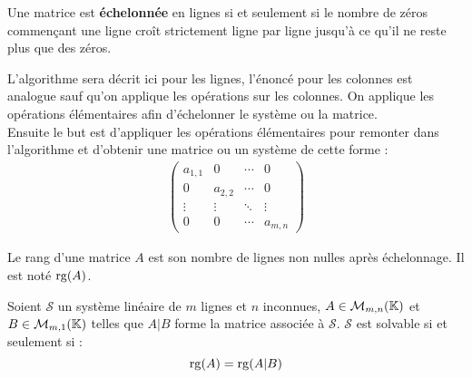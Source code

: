 \begin{definition}
	Une matrice est \textbf{échelonnée} en lignes si et seulement si le nombre de zéros commençant une ligne croît strictement ligne par ligne jusqu'à ce qu'il ne reste plus que des zéros.
\end{definition}

L'algorithme sera décrit ici pour les lignes, l'énoncé pour les colonnes est analogue sauf qu'on applique les opérations sur les colonnes.
   	On applique les opérations élémentaires afin d'échelonner le système ou la matrice.
    \\
    Ensuite le but est d'appliquer les opérations élémentaires pour \og remonter \fg dans l'algorithme et d'obtenir une matrice ou un système de cette forme :
    \begin{align*}
        \begin{pmatrix}
            a_{1,1} & 0 & \cdots & 0 \\
            0 & a_{2,2} & \cdots & 0 \\ 
            \vdots & \vdots & \ddots & \vdots \\ 
            0 & 0 & \cdots & a_{m,n}
        \end{pmatrix}
    \end{align*}

\begin{definition}
	Le rang d'une matrice $A$ est son nombre de lignes non nulles après échelonnage. Il est noté $\operatorname{rg}(A)$.
\end{definition}

\begin{theorem}
    Soient $\mathcal{S}$ un système linéaire de $m$ lignes et $n$ inconnues, $A \in \mathcal{M}_{m,n}(\mathbb{K})$ et $B \in \mathcal{M}_{m,1}(\mathbb{K})$ telles que $A|B$ forme la matrice associée à $\mathcal{S}$. $\mathcal{S}$ est solvable si et seulement si :
    \[ \operatorname{rg}(A) = \operatorname{rg}(A|B) \]
\end{theorem}

